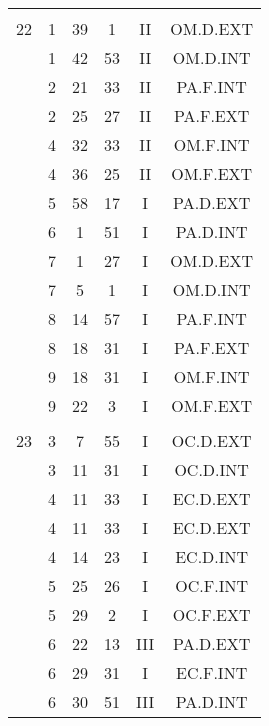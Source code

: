 \documentclass[12pt, a4paper]{article}
\begin{document}
\begin{multicols}{3}
{\begin{tabular}{c c c c c c}
	 	 	 	 & & & & & \\%
	 	 	 	22 & 1 & 39 & 1 & II & OM.D.EXT\\%
	 	 	 	 & 1 & 42 & 53 & II & OM.D.INT\\%
	 	 	 	 & 2 & 21 & 33 & II & PA.F.INT\\%
	 	 	 	 & 2 & 25 & 27 & II & PA.F.EXT\\%
	 	 	 	 & 4 & 32 & 33 & II & OM.F.INT\\%
	 	 	 	 & 4 & 36 & 25 & II & OM.F.EXT\\%
	 	 	 	 & 5 & 58 & 17 & I & PA.D.EXT\\%
	 	 	 	 & 6 & 1 & 51 & I & PA.D.INT\\%
	 	 	 	 & 7 & 1 & 27 & I & OM.D.EXT\\%
	 	 	 	 & 7 & 5 & 1 & I & OM.D.INT\\%
	 	 	 	 & 8 & 14 & 57 & I & PA.F.INT\\%
	 	 	 	 & 8 & 18 & 31 & I & PA.F.EXT\\%
	 	 	 	 & 9 & 18 & 31 & I & OM.F.INT\\%
	 	 	 	 & 9 & 22 & 3 & I & OM.F.EXT\\%
	 	 	 	 & & & & & \\%
	 	 	 	23 & 3 & 7 & 55 & I & OC.D.EXT\\%
	 	 	 	 & 3 & 11 & 31 & I & OC.D.INT\\%
	 	 	 	 & 4 & 11 & 33 & I & EC.D.EXT\\%
	 	 	 	 & 4 & 11 & 33 & I & EC.D.EXT\\%
	 	 	 	 & 4 & 14 & 23 & I & EC.D.INT\\%
	 	 	 	 & 5 & 25 & 26 & I & OC.F.INT\\%
	 	 	 	 & 5 & 29 & 2 & I & OC.F.EXT\\%
	 	 	 	 & 6 & 22 & 13 & III & PA.D.EXT\\%
	 	 	 	 & 6 & 29 & 31 & I & EC.F.INT\\%
	 	 	 	 & 6 & 30 & 51 & III & PA.D.INT\\%
	 	 \end{tabular}
 	}
\end{multicols}
\end{document}
